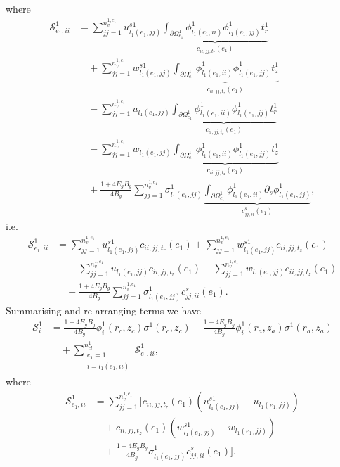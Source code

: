 \documentclass{article}
\begin{document}
where
\begin{align}
\mathcal{S}_{e_1,ii}^1 &= \sum_{jj=1}^{n_v^{1,e_1}} u_{l_1(e_1,jj)}^{s1} \underbrace{\int_{\partial \Omega_{e_1}^1} \phi_{l_1(e_1,ii)}^1 \phi_{l_1(e_1,jj)}^1 t_r^1}_{c_{ii,jj,t_r}(e_1)} \nonumber\\
&\quad + \sum_{jj=1}^{n_v^{1,e_1}} w_{l_1(e_1,jj)}^{s1} \underbrace{\int_{\partial \Omega_{e_1}^1} \phi_{l_1(e_1,ii)}^1 \phi_{l_1(e_1,jj)}^1 t_z^1}_{c_{ii,jj,t_z}(e_1)} \nonumber\\
&\quad - \sum_{jj=1}^{n_v^{1,e_1}} u_{l_1(e_1,jj)} \underbrace{\int_{\partial \Omega_{e_1}^1} \phi_{l_1(e_1,ii)}^1 \phi_{l_1(e_1,jj)}^1 t_r^1}_{c_{ii,jj,t_r}(e_1)} \nonumber\\
&\quad - \sum_{jj=1}^{n_v^{1,e_1}} w_{l_1(e_1,jj)} \underbrace{\int_{\partial \Omega_{e_1}^1} \phi_{l_1(e_1,ii)}^1 \phi_{l_1(e_1,jj)}^1 t_z^1}_{c_{ii,jj,t_z}(e_1)} \nonumber\\
&\quad + \frac{1 + 4 E_g B_g}{4 B_g} \sum_{jj=1}^{n_v^{1,e_1}} \sigma_{l_1(e_1,jj)}^1 \underbrace{\int_{\partial \Omega_{e_1}^1} \phi_{l_1(e_1,ii)}^1 \partial_s \phi_{l_1(e_1,jj)}^1}_{c_{jj,ii}^s(e_1)}, \tag{12.15}
\end{align}
i.e.
\begin{align}
\mathcal{S}_{e_1,ii}^1 &= \sum_{jj=1}^{n_v^{1,e_1}} u_{l_1(e_1,jj)}^{s1} c_{ii,jj,t_r}(e_1) + \sum_{jj=1}^{n_v^{1,e_1}} w_{l_1(e_1,jj)}^{s1} c_{ii,jj,t_z}(e_1) \nonumber\\
&\quad - \sum_{jj=1}^{n_v^{1,e_1}} u_{l_1(e_1,jj)} c_{ii,jj,t_r}(e_1) - \sum_{jj=1}^{n_v^{1,e_1}} w_{l_1(e_1,jj)} c_{ii,jj,t_z}(e_1) \nonumber\\
&\quad + \frac{1 + 4 E_g B_g}{4 B_g} \sum_{jj=1}^{n_v^{1,e_1}} \sigma_{l_1(e_1,jj)}^1 c_{jj,ii}^s(e_1). \tag{12.16}
\end{align}
Summarising and re-arranging terms we have
\begin{align}
\mathcal{S}_i^1 &= \frac{1 + 4 E_g B_g}{4 B_g} \phi_i^1(r_c,z_c) \sigma^1(r_c,z_c) - \frac{1 + 4 E_g B_g}{4 B_g} \phi_i^1(r_a,z_a) \sigma^1(r_a,z_a) \nonumber\\
&\quad + \sum_{\substack{e_1=1\\ i=l_1(e_1,ii)}}^{n_{el}^1} \mathcal{S}_{e_1,ii}^1, \tag{12.17}
\end{align}
where
\begin{align}
\mathcal{S}_{e_1,ii}^1 &= \sum_{jj=1}^{n_v^{1,e_1}} \Bigg[ c_{ii,jj,t_r}(e_1) \left( u_{l_1(e_1,jj)}^{s1} - u_{l_1(e_1,jj)} \right) \nonumber\\
&\quad + c_{ii,jj,t_z}(e_1) \left( w_{l_1(e_1,jj)}^{s1} - w_{l_1(e_1,jj)} \right) \nonumber\\
&\quad + \frac{1 + 4 E_g B_g}{4 B_g} \sigma_{l_1(e_1,jj)}^1 c_{jj,ii}^s(e_1) \Bigg]. \tag{12.18}
\end{align}
\end{document}
